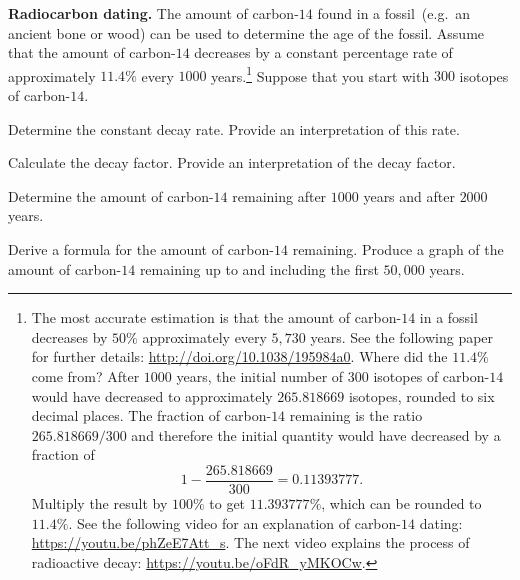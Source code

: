 \documentclass[a4paper,oneside,12pt]{article}
\begin{document}
\begin{example}
\label{eg:exponential:radiocarbon_dating}
\textbf{Radiocarbon dating.}
The amount of carbon-$14$ found in a fossil~(e.g.~an ancient bone or
wood) can be used to determine the age of the fossil.  Assume that the
amount of carbon-$14$ decreases by a constant percentage rate of
approximately $11.4\%$ every $1000$ years.\footnote{
  The most accurate estimation is that the amount of carbon-$14$ in a
  fossil decreases by $50\%$ approximately every $5,730$ years.  See
  the following paper for further details:
  \url{http://doi.org/10.1038/195984a0}.  Where did the $11.4\%$ come
  from?  After $1000$ years, the initial number of $300$ isotopes of
  carbon-$14$ would have decreased to approximately $265.818669$
  isotopes, rounded to six decimal places.  The fraction of
  carbon-$14$ remaining is the ratio $265.818669 / 300$ and therefore
  the initial quantity would have decreased by a fraction of
  \[
  1 - \frac{265.818669}{300}
  =
  0.11393777.
  \]
  Multiply the result by $100\%$ to get $11.393777\%$, which can be
  rounded to $11.4\%$.  See the following video for an explanation of
  carbon-$14$ dating: \url{https://youtu.be/phZeE7Att_s}.  The next
  video explains the process of radioactive decay:
  \url{https://youtu.be/oFdR_yMKOCw}.
}
Suppose that you start with $300$ isotopes of carbon-$14$.
\begin{packedenum}
\item\label{subeg:exponential:carbon14_decay_rate}
  Determine the constant decay rate.  Provide an interpretation of
  this rate.

\item\label{subeg:exponential:carbon14_decay_factor}
  Calculate the decay factor.  Provide an interpretation of the decay
  factor.

\item\label{subeg:exponential:carbon14_after_1000_and_2000_years}
  Determine the amount of carbon-$14$ remaining after $1000$ years and
  after $2000$ years.

\item\label{subeg:exponential:carbon14_formula_graph}
  Derive a formula for the amount of carbon-$14$ remaining.  Produce a
  graph of the amount of carbon-$14$ remaining up to and including the
  first $50,000$ years.
\end{packedenum}
\end{example}
\end{document}

